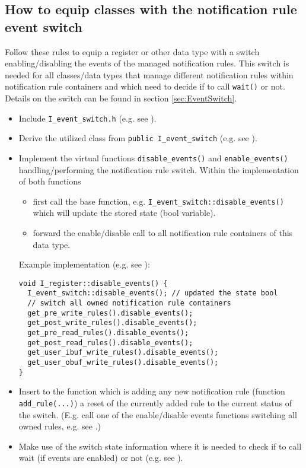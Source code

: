 \subsection{How to equip classes with the notification rule event switch}
\label{sec:HowToEventSwitch}
Follow these rules to equip a \GreenReg register or other data type with a switch enabling/disabling the events of the managed notification rules. This switch is needed for all classes/data types that manage different notification rules within notification rule containers and which need to decide if to call \lstinline|wait()| or not. Details on the switch can be found in section \ref{sec:EventSwitch}.

\begin{itemize}
  \item Include \lstinline|I_event_switch.h| (e.g. see ).
  \item Derive the utilized class from \lstinline|public I_event_switch| (e.g. see ).
  \item Implement the virtual functions \lstinline|disable_events()| and \lstinline|enable_events()| handling/performing the notification rule switch. \newline \newline
  Within the implementation of both functions
  \begin{itemize}
    \item first call the base function, e.g. \lstinline|I_event_switch::disable_events()| which will update the stored state (bool variable).
    \item forward the enable/disable call to all notification rule containers of this data type.
  \end{itemize}
   Example implementation (e.g. see ):
\begin{lstlisting}
void I_register::disable_events() {
  I_event_switch::disable_events(); // updated the state bool
  // switch all owned notification rule containers
  get_pre_write_rules().disable_events();
  get_post_write_rules().disable_events();
  get_pre_read_rules().disable_events();
  get_post_read_rules().disable_events();
  get_user_ibuf_write_rules().disable_events();
  get_user_obuf_write_rules().disable_events();
}
\end{lstlisting}
  \item Insert to the function which is adding any new notification rule (function \lstinline|add_rule(...)|) a reset of the currently added rule to the current status of the switch. (E.g. call one of the enable/disable events functions switching all owned rules, e.g. see .)
  \item Make use of the switch state information where it is needed to check if to call wait (if events are enabled) or not (e.g. see ).
\end{itemize}


